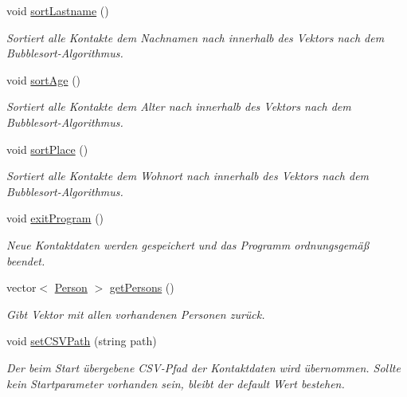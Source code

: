 \begin{DoxyCompactItemize}
void \hyperlink{classContactManager_1_1Controller_acc4da7b605dfc2fd6acba5bb8b14a36a}{sort\+Lastname} ()
\begin{DoxyCompactList}\small\item\em Sortiert alle Kontakte dem Nachnamen nach innerhalb des Vektors nach dem Bubblesort-\/\+Algorithmus.\end{DoxyCompactList}\item 
void \hyperlink{classContactManager_1_1Controller_ad2255cf6b5cfe0391df4177ff46ad9e7}{sort\+Age} ()
\begin{DoxyCompactList}\small\item\em Sortiert alle Kontakte dem Alter nach innerhalb des Vektors nach dem Bubblesort-\/\+Algorithmus.\end{DoxyCompactList}\item 
void \hyperlink{classContactManager_1_1Controller_acfb43d6054e00cb959f71c993851f172}{sort\+Place} ()
\begin{DoxyCompactList}\small\item\em Sortiert alle Kontakte dem Wohnort nach innerhalb des Vektors nach dem Bubblesort-\/\+Algorithmus.\end{DoxyCompactList}\item 
void \hyperlink{classContactManager_1_1Controller_a923b6bc497d6f3f7c804a147743744f3}{exit\+Program} ()
\begin{DoxyCompactList}\small\item\em Neue Kontaktdaten werden gespeichert und das Programm ordnungsgemäß beendet.\end{DoxyCompactList}\item 
vector$<$ \hyperlink{classContactManager_1_1Person}{Person} $>$ \hyperlink{classContactManager_1_1Controller_a487e6797ca3e968830fea9e0cd8d8faa}{get\+Persons} ()
\begin{DoxyCompactList}\small\item\em Gibt Vektor mit allen vorhandenen Personen zurück.\end{DoxyCompactList}\item 
void \hyperlink{classContactManager_1_1Controller_a36ae8467ae2a00a693de08f3be42cda4}{set\+C\+S\+V\+Path} (string path)
\begin{DoxyCompactList}\small\item\em Der beim Start übergebene C\+S\+V-\/\+Pfad der Kontaktdaten wird übernommen. Sollte kein Startparameter vorhanden sein, bleibt der default Wert bestehen.\end{DoxyCompactList}\end{DoxyCompactItemize}
